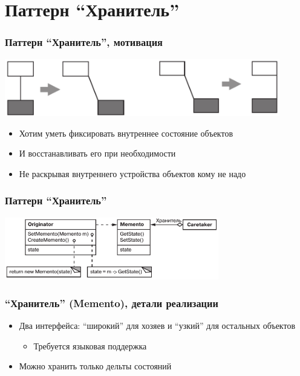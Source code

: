 \documentclass[xetex,mathserif,serif]{beamer}
\begin{document}
    \section{Паттерн ``Хранитель''}

    \begin{frame}
        \frametitle{Паттерн ``Хранитель'', мотивация}
        \begin{center}
            \includegraphics[width=0.9\textwidth]{mementoMotivation.png}
        \end{center}
        \begin{itemize}
            \item Хотим уметь фиксировать внутреннее состояние объектов
            \item И восстанавливать его при необходимости
            \item Не раскрывая внутреннего устройства объектов кому не надо
        \end{itemize}
    \end{frame}

    \begin{frame}
        \frametitle{Паттерн ``Хранитель''}
        \begin{center}
            \includegraphics[width=0.7\textwidth]{memento.png}
        \end{center}
    \end{frame}

    \begin{frame}
        \frametitle{``Хранитель'' (Memento), детали реализации}
        \begin{itemize}
            \item Два интерфейса: ``широкий'' для хозяев и ``узкий'' для остальных объектов
            \begin{itemize}
                \item Требуется языковая поддержка
            \end{itemize}
            \item Можно хранить только дельты состояний
        \end{itemize}
    \end{frame}
\end{document}

